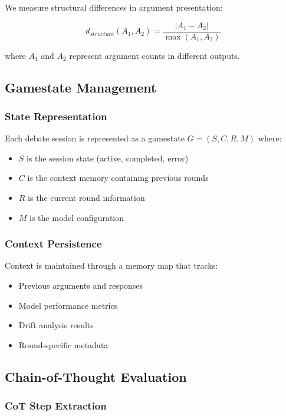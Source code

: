 \documentclass[11pt]{article}
\begin{document}
We measure structural differences in argument presentation:

\begin{equation}
d_{structure}(A_1, A_2) = \frac{|A_1 - A_2|}{\max(A_1, A_2)}
\end{equation}

where $A_1$ and $A_2$ represent argument counts in different outputs.

\subsection{Gamestate Management}

\subsubsection{State Representation}

Each debate session is represented as a gamestate $G = (S, C, R, M)$ where:
\begin{itemize}
    \item $S$ is the session state (active, completed, error)
    \item $C$ is the context memory containing previous rounds
    \item $R$ is the current round information
    \item $M$ is the model configuration
\end{itemize}

\subsubsection{Context Persistence}

Context is maintained through a memory map that tracks:
\begin{itemize}
    \item Previous arguments and responses
    \item Model performance metrics
    \item Drift analysis results
    \item Round-specific metadata
\end{itemize}

\subsection{Chain-of-Thought Evaluation}

\subsubsection{CoT Step Extraction}
\end{document}
